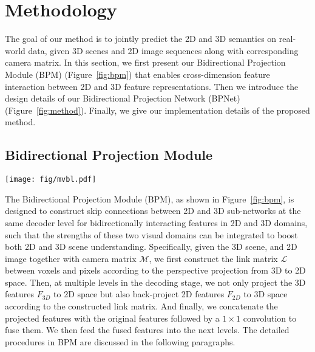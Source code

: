 \documentclass[final]{cvpr}
\begin{document}
 


\section{Methodology}
\label{sec:method}
\vspace{-2mm}


The goal of our method is to jointly predict the 2D and 3D semantics on real-world data, given 3D scenes and 2D image sequences along with corresponding camera matrix. In this section, we first present our Bidirectional Projection Module (BPM) (Figure~\ref{fig:bpm}) that enables cross-dimension feature interaction between 2D and 3D feature representations. Then we introduce the design details of our Bidirectional Projection Network (BPNet) (Figure~\ref{fig:method}). Finally, we give our implementation details of the proposed method.

\vspace{-1mm}
\subsection{Bidirectional Projection Module}
\label{subsec:bpm}
\vspace{-2mm}

\begin{figure*}[!t] 
	\centering
	\texttt{[image: fig/mvbl.pdf]}
\caption{
		Bidirectional Projection Module (BPM). The link matrix construction procedure between one view and the 3D scene is illustrated in (a), and the bidirectional projection procedure is shown in (b).
	$\mathcal{M}$ is the camera matrix; the $i^\text{th}$, $j^\text{th}$ and $k^\text{th}$ voxels are typical examples of three kinds of voxels: voxels that have corresponding pixels under this view, voxels that are occluded by others, and voxels that are out of the view frustum. $F_\text{2D}$ and $F_\text{3D}$ are features in 2D and 3D spaces, respectively. $\widetilde{F_\text{2D}}$ and $\widetilde{F_\text{3D}}$ are the 2D and 3D bidirectionally projected features from the other domain, respectively.
	}
	\vspace{-5mm}
	\label{fig:bpm}
\end{figure*} 


The Bidirectional Projection Module (BPM), as shown in Figure~\ref{fig:bpm}, is designed to construct skip connections between 2D and 3D sub-networks at the same decoder level for bidirectionally interacting features in 2D and 3D domains, such that the strengths of these two visual domains can be integrated to boost both 2D and 3D scene understanding.
Specifically, given the 3D scene, and 2D image together with camera matrix $\mathcal{M}$, we first construct the link matrix $\mathcal{L}$ between voxels and pixels according to the perspective projection from 3D to 2D space.
Then, at multiple levels in the decoding stage, we not only project the 3D features $F_{3D}$ to 2D space but also back-project 2D features $F_{2D}$ to 3D space according to the constructed link matrix.
And finally, we concatenate the projected features with the original features followed by a $1\times1$ convolution to fuse them. We then feed the fused features into the next levels.
The detailed procedures in BPM are discussed in the following paragraphs.
\end{document}
